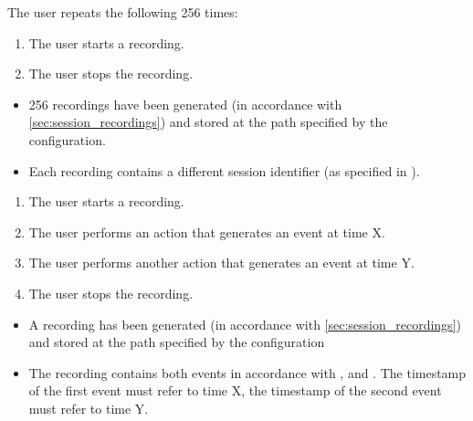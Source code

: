 \begin{tests}
    {The \gls{user} repeats the following 256 times:
    \begin{enumerate}
        \item The \gls{user} starts a recording.
        \item The \gls{user} stops the recording.
    \end{enumerate}}
    {\begin{itemize}
        \item 256 recordings have been generated (in accordance with \ref{sec:session_recordings}) and stored at the path specified by the configuration.
        \item Each recording contains a different session identifier (as specified in ).
    \end{itemize}}

    {\begin{enumerate}
        \item The \gls{user} starts a recording.
        \item The \gls{user} performs an action that generates an \gls{event} at time X.
        \item The \gls{user} performs another action that generates an \gls{event} at time Y.
        \item The \gls{user} stops the recording.
    \end{enumerate}}
    {\begin{itemize}
        \item A recording has been generated (in accordance with \ref{sec:session_recordings}) and stored at the path specified by the configuration
        \item The recording contains both events in accordance with ,  and . The timestamp of the first event must refer to time X, the timestamp of the second event must refer to time Y.
    \end{itemize}}


\end{tests}
